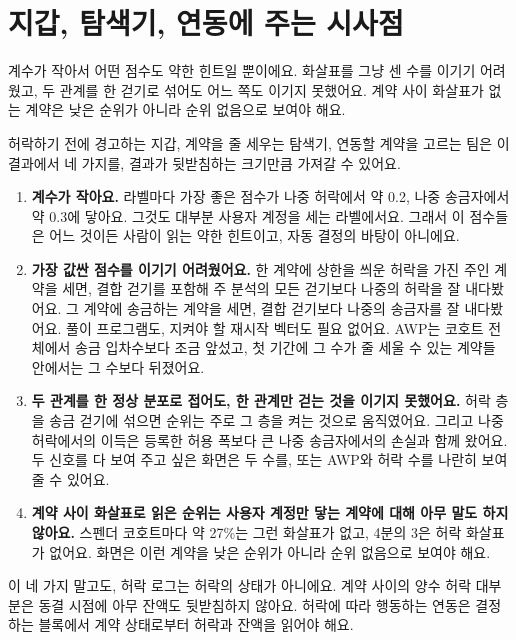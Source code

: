 \section{지갑, 탐색기, 연동에 주는 시사점}
\label{sec:implications}

\begin{yoji}
계수가 작아서 어떤 점수도 약한 힌트일 뿐이에요. 화살표를 그냥 센 수를 이기기 어려웠고, 두 관계를 한 걷기로 섞어도 어느 쪽도 이기지 못했어요. 계약 사이 화살표가 없는 계약은 낮은 순위가 아니라 순위 없음으로 보여야 해요.
\end{yoji}

허락하기 전에 경고하는 지갑, 계약을 줄 세우는 탐색기, 연동할 계약을 고르는 팀은 이 결과에서 네 가지를, 결과가 뒷받침하는 크기만큼 가져갈 수 있어요.

\begin{enumerate}
\item \textbf{계수가 작아요.} 라벨마다 가장 좋은 점수가 나중 허락에서 약 0.2, 나중 송금자에서 약 0.3에 닿아요. 그것도 대부분 사용자 계정을 세는 라벨에서요. 그래서 이 점수들은 어느 것이든 사람이 읽는 약한 힌트이고, 자동 결정의 바탕이 아니에요.
\item \textbf{가장 값싼 점수를 이기기 어려웠어요.} 한 계약에 상한을 씌운 허락을 가진 주인 계약을 세면, 결합 걷기를 포함해 주 분석의 모든 걷기보다 나중의 허락을 잘 내다봤어요. 그 계약에 송금하는 계약을 세면, 결합 걷기보다 나중의 송금자를 잘 내다봤어요. 풀이 프로그램도, 지켜야 할 재시작 벡터도 필요 없어요. AWP는 코호트 전체에서 송금 입차수보다 조금 앞섰고, 첫 기간에 그 수가 줄 세울 수 있는 계약들 안에서는 그 수보다 뒤졌어요.
\item \textbf{두 관계를 한 정상 분포로 접어도, 한 관계만 걷는 것을 이기지 못했어요.} 허락 층을 송금 걷기에 섞으면 순위는 주로 그 층을 켜는 것으로 움직였어요. 그리고 나중 허락에서의 이득은 등록한 허용 폭보다 큰 나중 송금자에서의 손실과 함께 왔어요. 두 신호를 다 보여 주고 싶은 화면은 두 수를, 또는 AWP와 허락 수를 나란히 보여 줄 수 있어요.
\item \textbf{계약 사이 화살표로 읽은 순위는 사용자 계정만 닿는 계약에 대해 아무 말도 하지 않아요.} 스펜더 코호트마다 약 27\%는 그런 화살표가 없고, 4분의 3은 허락 화살표가 없어요. 화면은 이런 계약을 낮은 순위가 아니라 순위 없음으로 보여야 해요.
\end{enumerate}

이 네 가지 말고도, 허락 로그는 허락의 상태가 아니에요. 계약 사이의 양수 허락 대부분은 동결 시점에 아무 잔액도 뒷받침하지 않아요. 허락에 따라 행동하는 연동은 결정하는 블록에서 계약 상태로부터 허락과 잔액을 읽어야 해요.

